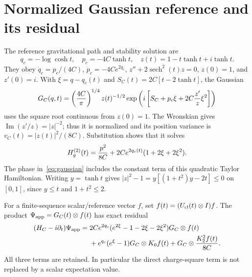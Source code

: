 \documentclass[11pt]{article}
\newcommand{\sech}{\operatorname{sech}}
\begin{document}
\section{Normalized Gaussian reference and its residual}
The reference gravitational path and stability solution are
\begin{equation}
 q_c=-\log\cosh t,\quad p_c=-4C\tanh t,\quad
 z(t)=1-t\tanh t+i\tanh t. \label{eq:path}
\end{equation}
They obey $\dot q_c=p_c/(4C)$, $\dot p_c=-4Ce^{2q_c}$,
$z''+2\sech^2(t)z=0$, $z(0)=1$, and $z'(0)=i$.
With $\xi=q-q_c(t)$ and $S_C(t)=2C[t-2\tanh t]$, the Gaussian
\begin{equation}
 G_C(q,t)=\left({4C\over\pi}\right)^{1/4}z(t)^{-1/2}
 \exp\left(i\left[S_C+p_c\xi+2C{z'\over z}\xi^2\right]\right)
 \label{eq:gaussian}
\end{equation}
uses the square root continuous from $z(0)=1$. The Wronskian gives
$\operatorname{Im}(z'/z)=|z|^{-2}$; thus it is normalized and its position
variance is $v_C(t)=|z(t)|^2/(8C)$. Substitution shows that it solves
\begin{equation}
 H_g^{(2)}(t)={p^2\over8C}+2Ce^{2q_c(t)}(1+2\xi+2\xi^2).
 \label{eq:Hquad}
\end{equation}
The phase in~\eqref{eq:gaussian} includes the constant term of this
quadratic Taylor Hamiltonian. Writing $y=\tanh t$ gives
$|z|^2-1=y[(1+t^2)y-2t]\le0$ on $[0,1]$, since $y\le t$ and
$1+t^2\le2$.

For a finite-sequence scalar/reference vector $f$, set
$f(t)=(U_{\rm cl}(t)\otimes I)f$. The product
$\Psi_{\rm app}=G_C(t)\otimes f(t)$ has exact residual
\begin{align}
 (H_C-i\partial_t)\Psi_{\rm app}={}&
 2Ce^{2q_c}(e^{2\xi}-1-2\xi-2\xi^2)G_C\otimes f(t)\notag\\
 &+e^{q_c}(e^\xi-1)G_C\otimes K_0f(t)
 +G_C\otimes {K_2^2f(t)\over8C}.\label{eq:residual}
\end{align}
All three terms are retained. In particular the direct charge-square term
is not replaced by a scalar expectation value.
\end{document}

